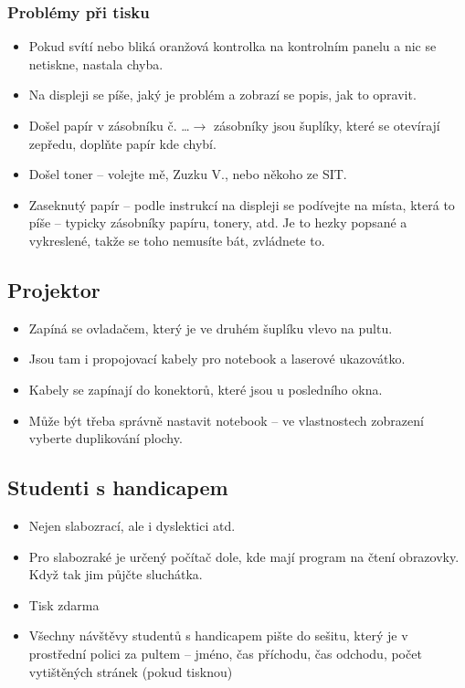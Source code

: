 \documentclass{article}
\begin{document}
\subsubsection{Problémy při tisku}
\begin{itemize}
  \item Pokud svítí nebo bliká oranžová kontrolka na kontrolním panelu a nic se netiskne, nastala chyba.
  \item Na displeji se píše, jaký je problém a zobrazí se popis, jak to opravit.
  \item Došel papír v zásobníku č. \ldots $\rightarrow$ zásobníky jsou šuplíky, které se otevírají zepředu, doplňte papír kde chybí.
  \item Došel toner -- volejte mě, Zuzku V., nebo někoho ze SIT.
  \item Zaseknutý papír -- podle instrukcí na displeji se podívejte na místa, která to píše -- typicky zásobníky papíru, tonery, atd. Je to hezky popsané a vykreslené, takže se toho nemusíte bát, zvládnete to.
  \end{itemize}
\subsection{Projektor}

\begin{itemize}
\item  Zapíná se ovladačem, který je ve druhém šuplíku vlevo na pultu.
\item  Jsou tam i propojovací kabely pro notebook a laserové ukazovátko.
\item  Kabely se zapínají do konektorů, které jsou u posledního okna.
\item  Může být třeba správně nastavit notebook -- ve vlastnostech zobrazení vyberte duplikování plochy.
\end{itemize}

\subsection{Studenti s handicapem}

\begin{itemize}
\item Nejen slabozrací, ale i dyslektici atd.
\item Pro slabozraké je určený počítač dole, kde mají program na čtení obrazovky. Když tak jim půjčte sluchátka.
\item Tisk zdarma
\item Všechny návštěvy studentů s handicapem pište do sešitu, který je v prostřední polici za pultem -- jméno, čas příchodu, čas odchodu,
počet vytištěných stránek (pokud tisknou)
\end{itemize}
\end{document}
